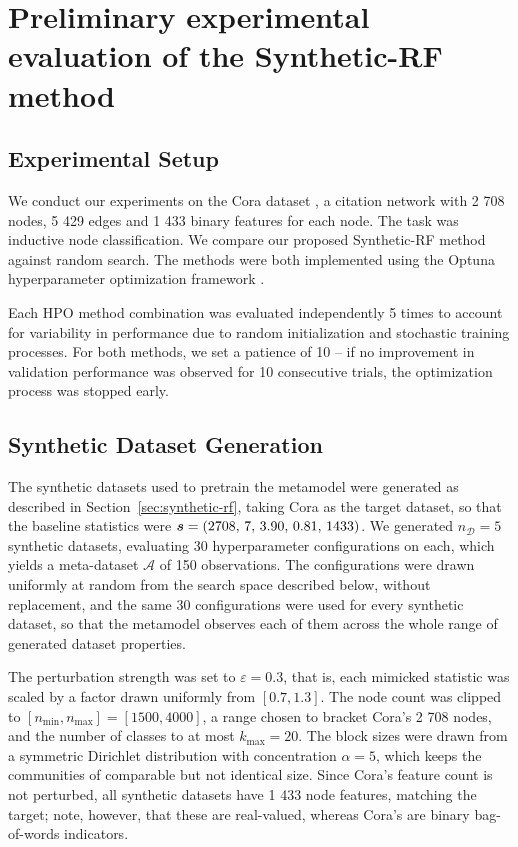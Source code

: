\section{Preliminary experimental evaluation of the Synthetic-RF method}
\label{sec:experimental-evaluation}

\subsection{Experimental Setup}

We conduct our experiments on the Cora dataset \cite{yang_revisiting_2016}, a citation network with 2 708 nodes, 5 429 edges and 1 433 binary features for each node. The task was inductive node classification. We compare our proposed Synthetic-RF method against random search. The methods were both implemented using the Optuna hyperparameter optimization framework \cite{akiba_optuna_2019}.

Each HPO method combination was evaluated independently 5 times to account for variability in performance due to random initialization and stochastic training processes. For both methods, we set a patience of 10 -- if no improvement in validation performance was observed for 10 consecutive trials, the optimization process was stopped early.

\subsection{Synthetic Dataset Generation}

The synthetic datasets used to pretrain the metamodel were generated as described in Section~\ref{sec:synthetic-rf}, taking Cora as the target dataset, so that the baseline statistics were \( \boldsymbol{s} = \left( 2708, \, 7, \, 3.90, \, 0.81, \, 1433 \right) \). We generated \( n_{\mathcal{D}} = 5 \) synthetic datasets, evaluating 30 hyperparameter configurations on each, which yields a meta-dataset \( \mathcal{A} \) of 150 observations. The configurations were drawn uniformly at random from the search space described below, without replacement, and the same 30 configurations were used for every synthetic dataset, so that the metamodel observes each of them across the whole range of generated dataset properties.

The perturbation strength was set to \( \varepsilon = 0.3 \), that is, each mimicked statistic was scaled by a factor drawn uniformly from \( \left[ 0.7, 1.3 \right] \). The node count was clipped to \( \left[ n_{\min}, n_{\max} \right] = \left[ 1500, 4000 \right] \), a range chosen to bracket Cora's 2 708 nodes, and the number of classes to at most \( k_{\max} = 20 \). The block sizes were drawn from a symmetric Dirichlet distribution with concentration \( \alpha = 5 \), which keeps the communities of comparable but not identical size. Since Cora's feature count is not perturbed, all synthetic datasets have 1 433 node features, matching the target; note, however, that these are real-valued, whereas Cora's are binary bag-of-words indicators.

